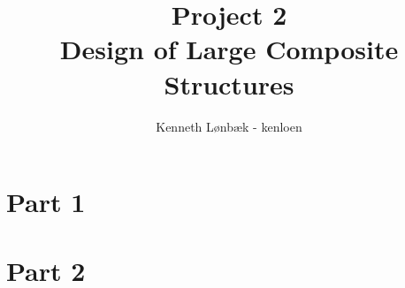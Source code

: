 \documentclass[10pt,a4paper,20pt]{article}
\title{\textbf{Project 2} \\Design of Large Composite Structures}
\date{}
\author{Kenneth Lønbæk - kenloen}
\begin{document}
\maketitle  
\section{Part 1}
	
\section{Part 2}
	
	
\end{document}
